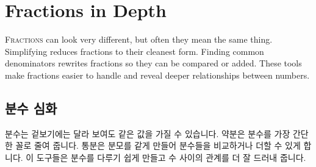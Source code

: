 \documentclass[12pt]{book}
\begin{document}
  \onesidedpaper\chapter{Fractions in Depth}
  \lettrine{F}{ractions} can look very different, but often they mean the 
  same thing. Simplifying reduces fractions to their cleanest form. 
  Finding common denominators rewrites fractions so they can be compared or 
  added. These tools make fractions easier to handle and reveal deeper 
  relationships between numbers.
  
  \section*{분수 심화}
  분수는 겉보기에는 달라 보여도 같은 값을 가질 수 있습니다. 약분은 분수를 
  가장 간단한 꼴로 줄여 줍니다. 통분은 분모를 같게 만들어 분수들을 비교하거나 
  더할 수 있게 합니다. 이 도구들은 분수를 다루기 쉽게 만들고 수 사이의 관계를 
  더 잘 드러내 줍니다.





\end{document}
